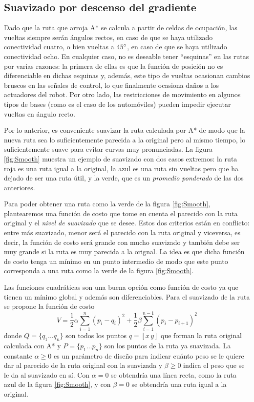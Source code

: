 \documentclass[a4paper]{article}
\begin{document}
\subsection{Suavizado por descenso del gradiente}
Dado que la ruta que arroja A* se calcula a partir de celdas de ocupación, las vueltas siempre serán ángulos rectos, en caso de que se haya utilizado conectividad cuatro, o bien vueltas a $45\degree$, en caso de que se haya utilizado conectividad ocho. En cualquier caso, no es deseable tener ``esquinas'' en las rutas por varias razones: la primera de ellas es que la función de posición no es diferenciable en dichas esquinas y, además, este tipo de vueltas ocasionan cambios bruscos en las señales de control, lo que finalmente ocasiona daños a los actuadores del robot. Por otro lado, las restricciones de movimiento en algunos tipos de bases (como es el caso de los automóviles) pueden impedir ejecutar vueltas en ángulo recto.

Por lo anterior, es conveniente suavizar la ruta calculada por A* de modo que la nueva ruta sea lo suficientemente parecida a la original pero al mismo tiempo, lo suficientemente suave para evitar curvas muy pronunciadas. La figura \ref{fig:Smooth} muestra un ejemplo de suavizado con dos casos extremos: la ruta roja es una ruta igual a la original, la azul es una ruta sin vueltas pero que ha dejado de ser una ruta útil, y la verde, que es un \textit{promedio ponderado} de las dos anteriores. 

Para poder obtener una ruta como la verde de la figura \ref{fig:Smooth}, plantearemos una función de costo que tome en cuenta el parecido con la ruta original y el \textit{nivel de suavizado} que se desee. Estos dos criterios están en conflicto: entre más suavizado, menor será el parecido con la ruta original y viceversa, es decir, la función de costo será grande con mucho suavizado y también debe ser muy grande si la ruta es muy parecida a la orignal. La idea es que dicha función de costo tenga un mínimo en un punto intermedio de modo que este punto corresponda a una ruta como la verde de la figura \ref{fig:Smooth}. 

Las funciones cuadráticas son una buena opción como función de costo ya que tienen un mínimo global y además son diferenciables. Para el suavizado de la ruta se propone la función de costo
\begin{equation}
V = \frac{1}{2}\alpha\sum_{i=1}^{n}\left(p_i - q_i\right)^2 + \frac{1}{2}\beta\sum_{i=1}^{n-1}\left(p_i - p_{i+1}\right)^2
\label{eq:Cost}
\end{equation}
donde $Q = \{q_1\dots q_n\}$ son todos los puntos $q = [x\,y]$ que forman la ruta original calculada con A* y $P=\{p_1\dots p_n\}$ son los puntos de la ruta ya suavizada. La constante $\alpha \geq 0$ es un parámetro de diseño para indicar cuánto peso se le quiere dar al parecido de la ruta original con la suavizada y $\beta \geq 0$ indica el peso que se le da al suavizado en sí. Con $\alpha = 0$ se obtendría una línea recta, como la ruta azul de la figura \ref{fig:Smooth}, y con $\beta = 0$ se obtendría una ruta igual a la original.
\end{document}
